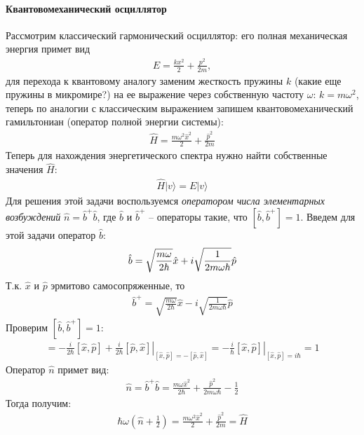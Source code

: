 \documentclass[__minimum__.tex]{subfiles}
\begin{document}
\paragraph{Квантовомеханический осциллятор}
Рассмотрим классический гармонический осциллятор: его полная механическая энергия примет вид
\begin{gather*}
  E = \frac{kx^2}{2}+\frac{p^2}{2m},
\end{gather*}
для перехода к квантовому аналогу заменим жесткость пружины $k$ (какие еще пружины в микромире?) на ее выражение через собственную частоту $\omega$: $k=m\omega^2$, теперь по аналогии с классическим выражением запишем квантовомеханический гамильтониан (оператор полной энергии системы):
\begin{gather*}
  \hat{H} = \frac{m\omega^2\hat{x}^2}{2}+\frac{\hat{p}^2}{2m}
\end{gather*}
Теперь для нахождения энергетического спектра нужно найти собственные значения $\hat{H}$:
\begin{gather*}
  \hat{H}|v\rangle = E|v\rangle
\end{gather*}
Для решения этой задачи воспользуемся \textit{оператором числа элементарных возбуждений} $\hat{n}=\hat{b}^{+}\hat{b}$, где $\hat{b}$ и $\hat{b}^{+}$ -- операторы такие, что $[\hat{b},\hat{b}^{+}]=1$. Введем для этой задачи оператор $\hat{b}$:
\begin{gather}
  \hat{b} = \sqrt{\frac{m\omega}{2\hbar}}\hat{x} + i\sqrt{\frac{1}{2m\omega\hbar}}\hat{p}
  \llabel{_50:b}
\end{gather}
Т.к. $\hat{x}$ и $\hat{p}$ эрмитово самосопряженные, то
\begin{gather*}
  \hat{b}^{+} = \sqrt{\frac{m\omega}{2\hbar}}\hat{x} - i\sqrt{\frac{1}{2m\omega\hbar}}\hat{p}
\end{gather*}
Проверим $[\hat{b},\hat{b}^{+}]=1$:
\begin{gather*}
  [\hat{b},\hat{b}^{+}]
  =
  \left.
  -\frac{i}{2\hbar}[\hat{x},\hat{p}]+\frac{i}{2\hbar}[\hat{p},\hat{x}]
  \right|_{[\hat{x},\hat{p}]=-[\hat{p},\hat{x}]}
  =
  \left.
  -\frac{i}{\hbar}[\hat{x},\hat{p}]
  \right|_{[\hat{x},\hat{p}]=i\hbar}
  =
  1
\end{gather*}
Оператор $\hat{n}$ примет вид:
\begin{gather*}
  \hat{n}=\hat{b}^{+}\hat{b}=\frac{m\omega\hat{x}^2}{2\hbar}+\frac{\hat{p}^2}{2m\omega\hbar}-\frac{1}{2}
\end{gather*}
Тогда получим:
\begin{gather*}
  \hbar\omega\left(\hat{n}+\frac{1}{2}\right)
  =
  \frac{m\omega^2\hat{x}^2}{2}+\frac{\hat{p}^2}{2m}
  =
  \hat{H}
\end{gather*}
\end{document}
